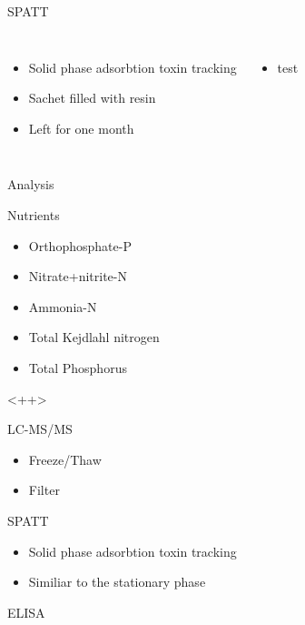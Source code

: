 \begin{frame}{SPATT}

\begin{columns}
	\begin{itemize}
		\item Solid phase adsorbtion toxin tracking
		\item Sachet filled with resin
		\item Left for one month
	\end{itemize}


	\begin{itemize}
		\item test
	\end{itemize}
\end{columns}

\end{frame}

\begin{frame}{Analysis}

\end{frame}

\begin{frame}{Nutrients}
	\begin{itemize}
		\item Orthophosphate-P 
		\item Nitrate+nitrite-N
		\item Ammonia-N 
		\item Total Kejdlahl nitrogen 
		\item Total Phosphorus
	\end{itemize}

	<++>

\end{frame}

\begin{frame}{LC-MS/MS}
	\begin{itemize}
		\item Freeze/Thaw
		\item Filter
	\end{itemize}

\end{frame}

\begin{frame}{SPATT}

	\begin{itemize}
		\item Solid phase adsorbtion toxin tracking
		\item Similiar to the stationary phase
	\end{itemize}

\end{frame}
\begin{frame}{ELISA}

\end{frame}

